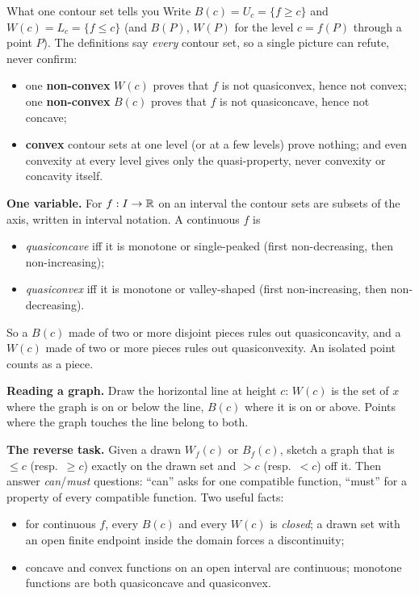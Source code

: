 \begin{rulebox}{What one contour set tells you}
Write $B(c)=U_c=\{f\ge c\}$ and $W(c)=L_c=\{f\le c\}$ (and $B(P)$, $W(P)$
for the level $c=f(P)$ through a point $P$). The definitions say
\emph{every} contour set, so a single picture can refute, never confirm:
\begin{itemize}[leftmargin=1.6em,itemsep=0.3ex]
  \item one \textbf{non-convex} $W(c)$ proves that $f$ is not
        quasiconvex, hence not convex; one \textbf{non-convex} $B(c)$
        proves that $f$ is not quasiconcave, hence not concave;
  \item \textbf{convex} contour sets at one level (or at a few levels)
        prove nothing; and even convexity at every level gives only the
        quasi-property, never convexity or concavity itself.
\end{itemize}
\textbf{One variable.} For $f:I\to\mathbb{R}$ on an interval the contour sets are
subsets of the axis, written in interval notation. A continuous $f$ is
\begin{itemize}[leftmargin=1.6em,itemsep=0.3ex]
  \item \emph{quasiconcave} iff it is monotone or single-peaked (first
        non-decreasing, then non-increasing);
  \item \emph{quasiconvex} iff it is monotone or valley-shaped (first
        non-increasing, then non-decreasing).
\end{itemize}
So a $B(c)$ made of two or more disjoint pieces rules out quasiconcavity,
and a $W(c)$ made of two or more pieces rules out quasiconvexity. An
isolated point counts as a piece.

\textbf{Reading a graph.} Draw the horizontal line at height $c$: $W(c)$ is
the set of $x$ where the graph is on or below the line, $B(c)$ where it is
on or above. Points where the graph touches the line belong to both.

\textbf{The reverse task.} Given a drawn $W_f(c)$ or $B_f(c)$, sketch a
graph that is $\le c$ (resp.\ $\ge c$) exactly on the drawn set and $>c$
(resp.\ $<c$) off it. Then answer \emph{can}/\emph{must} questions:
``can'' asks for one compatible function, ``must'' for a property of every
compatible function. Two useful facts:
\begin{itemize}[leftmargin=1.6em,itemsep=0.3ex]
  \item for continuous $f$, every $B(c)$ and every $W(c)$ is
        \emph{closed}; a drawn set with an open finite endpoint inside the
        domain forces a discontinuity;
  \item concave and convex functions on an open interval are continuous;
        monotone functions are both quasiconcave and quasiconvex.
\end{itemize}
\end{rulebox}

